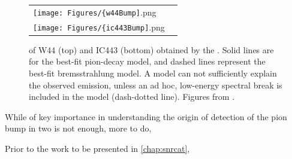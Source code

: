 \begin{figure}[h!]
	\begin{center}
		\begin{tabular}{ll}
			\texttt{[image: Figures/\{w44Bump]}.png} \\
			\texttt{[image: Figures/\{ic443Bump]}.png} \\
		\end{tabular}
	\end{center}
	\caption[\gam{} SEDs of SNRs W44 and IC443 obtained with the \lat{}]{\gam{} \seds{} of \snrs{} W44 (top) and IC443 (bottom) obtained by the \lat{}. Solid lines are for the best-fit pion-decay model, and dashed lines represent the best-fit bremsstrahlung model. A \brems{} model can not sufficiently explain the observed \gam{} emission, unless an ad hoc, low-energy spectral break is included in the \brems{} model (dash-dotted line). Figures from \cite{W44pion}.
		\label{fig:pionBump}
	}
\end{figure}
While of key importance in understanding the origin of \crs{} detection of the pion bump in two \snrs{} is not enough, more to do, 
	

Prior to the work to be presented in \ref{chap:snrcat}, 

 







